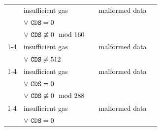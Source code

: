 \begin{figure}[!h]
{\begin{tabular}{|l||l|c|l|c|}
		\instBlsGOneMsm{}                 & insufficient gas                               & \multirow{3}{*}{\toOob}   & malformed data                                                    &                                                  \\
                                                  & $\vee~\texttt{CDS} = 0$                                &                           &                                                                   &                                                  \\
                                                  & $\vee~\texttt{CDS} \not \equiv 0 \mod 160$             &                           &                                                                   &                                                  \\ \cline{1-4}
		\instBlsGTwoAdd{}                 & insufficient gas                               & \multirow{2}{*}{\toOob}   & malformed data                                                    &                                                  \\
                                                  & $\vee~\texttt{CDS} \neq 512$                           &                           &                                                                   &                                                  \\ \cline{1-4}
		\instBlsGTwoMsm{}                 & insufficient gas                               & \multirow{3}{*}{\toOob}   & malformed data                                                    &                                                  \\
                                                  & $\vee~\texttt{CDS} = 0$                                &                           &                                                                   &                                                  \\
                                                  & $\vee~\texttt{CDS} \not \equiv 0 \mod 288$             &                           &                                                                   &                                                  \\ \cline{1-4}
		\instBlsPairingCheck{}            & insufficient gas                               & \multirow{3}{*}{\toOob}   & malformed data                                                    &                                                  \\
                                                  & $\vee~\texttt{CDS} = 0$                                &                           &                                                                   &                                                  \\

\end{tabular}}
\end{figure}
